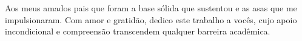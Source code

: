 
\begin{flushright}
\justify
Aos meus amados pais que foram a base sólida que sustentou e as asas que me impulsionaram.
Com amor e gratidão, dedico este trabalho a vocês, cujo apoio incondicional e compreensão transcendem qualquer barreira acadêmica. 
\end{flushright}


